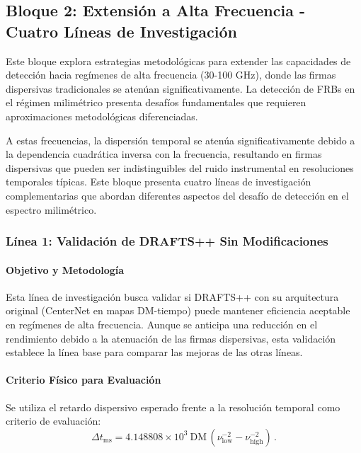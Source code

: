 

\subsection{Bloque 2: Extensión a Alta Frecuencia - Cuatro Líneas de Investigación}

Este bloque explora estrategias metodológicas para extender las capacidades de detección hacia regímenes de alta frecuencia (30-100 GHz), donde las firmas dispersivas tradicionales se atenúan significativamente. La detección de FRBs en el régimen milimétrico presenta desafíos fundamentales que requieren aproximaciones metodológicas diferenciadas.

A estas frecuencias, la dispersión temporal se atenúa significativamente debido a la dependencia cuadrática inversa con la frecuencia, resultando en firmas dispersivas que pueden ser indistinguibles del ruido instrumental en resoluciones temporales típicas. Este bloque presenta cuatro líneas de investigación complementarias que abordan diferentes aspectos del desafío de detección en el espectro milimétrico.

\subsubsection{Línea 1: Validación de DRAFTS++ Sin Modificaciones}

\paragraph{Objetivo y Metodología}

Esta línea de investigación busca validar si DRAFTS++ con su arquitectura original (CenterNet en mapas DM-tiempo) puede mantener eficiencia aceptable en regímenes de alta frecuencia. Aunque se anticipa una reducción en el rendimiento debido a la atenuación de las firmas dispersivas, esta validación establece la línea base para comparar las mejoras de las otras líneas.

\paragraph{Criterio Físico para Evaluación}

Se utiliza el retardo dispersivo esperado frente a la resolución temporal como criterio de evaluación:
\[
\Delta t_{\mathrm{ms}} = 4.148808 \times 10^{3}\ \mathrm{DM}\,(\nu_{\mathrm{low}}^{-2}-\nu_{\mathrm{high}}^{-2}) \, .
\]

